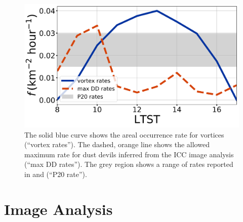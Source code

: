 \documentclass[linenumbers,trackchanges]{aastex63}
\begin{document}
\begin{figure}
    \centering
    \includegraphics[width=\textwidth]{figures/areal_occurrence_rate.png}
    \caption{The solid blue curve shows the areal occurrence rate for vortices (``vortex rates''). The dashed, orange line shows the allowed maximum rate for dust devils inferred from the ICC image analysis (``max DD rates''). The grey region shows a range of rates reported in \citet{2016Icar..266..315R} and \citet{2020GeoRL..4787234P} (``P20 rate'').}
    \label{fig:areal_occurrence_rate}
\end{figure}



\section{Image Analysis}
\label{sec:Image Analysis}
\end{document}
